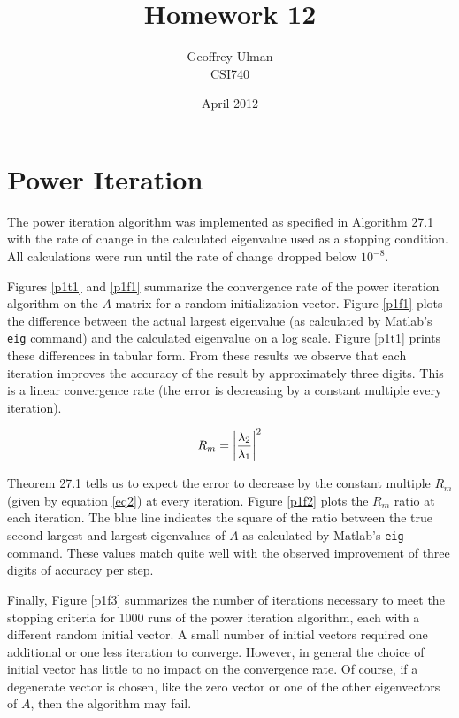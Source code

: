 \documentclass{article}
\DeclarePairedDelimiter\abs{\lvert}{\rvert}%
\begin{document}
\title{Homework 12}
\author{Geoffrey Ulman\\
        CSI740}
\date{April 2012}
\maketitle

\section{Power Iteration}\label{p1}

The power iteration algorithm was implemented as specified in Algorithm 27.1 with the rate of change in the calculated eigenvalue used as a stopping condition. All calculations were run until the rate of change dropped below \(10^{-8}\).

Figures \ref{p1t1} and \ref{p1f1} summarize the convergence rate of the power iteration algorithm on the \(A\) matrix for a random initialization vector. Figure \ref{p1f1} plots the difference between the actual largest eigenvalue (as calculated by Matlab's \verb|eig| command) and the calculated eigenvalue on a log scale. Figure \ref{p1t1} prints these differences in tabular form. From these results we observe that each iteration improves the accuracy of the result by approximately three digits. This is a linear convergence rate (the error is decreasing by a constant multiple every iteration).

\begin{equation}
R_m=\abs*{\frac{\lambda_2}{\lambda_1}}^2
\label{eq2}
\end{equation}

Theorem 27.1 tells us to expect the error to decrease by the constant multiple \(R_m\) (given by equation \ref{eq2}) at every iteration. Figure \ref{p1f2} plots the \(R_m\) ratio at each iteration. The blue line indicates the square of the ratio between the true second-largest and largest eigenvalues of \(A\) as calculated by Matlab's \verb|eig| command. These values match quite well with the observed improvement of three digits of accuracy per step.

Finally, Figure \ref{p1f3} summarizes the number of iterations necessary to meet the stopping criteria for 1000 runs of the power iteration algorithm, each with a different random initial vector. A small number of initial vectors required one additional or one less iteration to converge. However, in general the choice of initial vector has little to no impact on the convergence rate. Of course, if a degenerate vector is chosen, like the zero vector or one of the other eigenvectors of \(A\), then the algorithm may fail.
\end{document}

